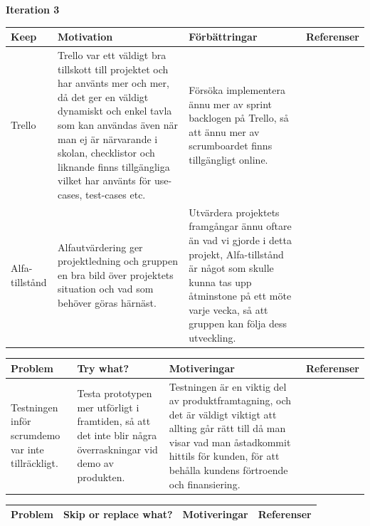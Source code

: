 \documentclass[conference,a4paper]{IEEEtran}
\newcommand\Tstrut{\rule{0pt}{2.6ex}}       %
\newcommand\Bstrut{\rule[-0.9ex]{0pt}{0pt}} %
\newcommand{\TBstrut}{\Tstrut\Bstrut} %
\begin{document}
\textbf{Iteration 3}


\begin{table}[H]
	\small
  \centering
	\begin{tabular}{|p{1.5cm}|p{2cm}|p{1.8cm}|p{1.5cm}|} %
    \hline
    Keep & Motivation & Förbättringar & Referenser \TBstrut \\
    \hline
    Trello & Trello var ett väldigt bra tillskott till projektet och har använts mer och mer, då det ger en väldigt dynamiskt och enkel tavla som kan användas även när man ej är närvarande i skolan, checklistor och liknande finns tillgängliga vilket har använts för use-cases, test-cases etc. & Försöka implementera ännu mer av sprint backlogen på Trello, så att ännu mer av scrumboardet finns tillgängligt online. & \TBstrut \\
    \hline
    Alfa-tillstånd & Alfautvärdering ger projektledning och gruppen en bra bild över projektets situation och vad som behöver göras härnäst. & Utvärdera projektets framgångar ännu oftare än vad vi gjorde i detta projekt, Alfa-tillstånd är något som skulle kunna tas upp åtminstone på ett möte varje vecka, så att gruppen kan följa dess utveckling. & \cite{ivarjacobson2017} \TBstrut \\
    \hline
  \end{tabular}
\end{table}

\begin{table}[H]
	\small
  \centering
	\begin{tabular}{|p{1.5cm}|p{2cm}|p{1.8cm}|p{1.5cm}|} %
    \hline
    Problem & Try what? & Motiveringar & Referenser \TBstrut \\
    \hline
   Testningen inför scrumdemo var inte tillräckligt. & Testa prototypen mer utförligt i framtiden, så att det inte blir några överraskningar vid demo av produkten. & Testningen är en viktig del av produktframtagning, och det är väldigt viktigt att allting går rätt till då man visar vad man åstadkommit hittils för kunden, för att behålla kundens förtroende och finansiering. & \TBstrut \\ 
    \hline
  \end{tabular}
\end{table}

\begin{table}[H]
	\small
  \centering
	\begin{tabular}{|p{1.5cm}|p{2cm}|p{1.8cm}|p{1.5cm}|} %
    \hline
    Problem & Skip or replace what? & Motiveringar & Referenser \TBstrut \\
    \hline
  \end{tabular}
\end{table}
\end{document}

